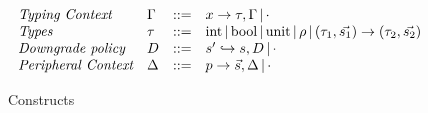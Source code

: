 \begin{figure}
\small
    \centering
\[
\begin{array}{llcl}
\textit{Typing Context} & \Gamma & ::= & x \rightarrow \tau, \Gamma \,|\, \cdot
\\ 
\textit{Types} & \tau & ::= & \text{int} \,|\, \text{bool} \,|\, \text{unit} \,|\, \rho \,|\, (\tau_1, \Vec{s_1}) \rightarrow (\tau_2, \Vec{s_2})  
\\
\textit{Downgrade policy} & D & ::= & s' \hookrightarrow s, D \,|\, \cdot
\\
\textit{Peripheral Context} & \Delta & ::= &  p \rightarrow \Vec{s}, \Delta \,|\, \cdot
\end{array}
\]
\caption{Constructs}
\label{fig:constructs}
\end{figure}

